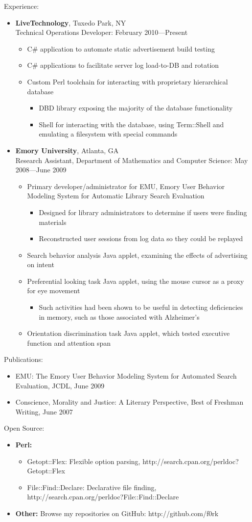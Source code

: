 \documentclass[10pt,oneside]{article}
\newenvironment{ressection}[1]{
	\vspace{1pt}
	{\fontfamily{phv}\selectfont\Large#1}
	\begin{itemize}
	\vspace{1pt}
}{
	\end{itemize}
}
\newcommand{\resitem}[1]{
	\vspace{-4pt}
	\item \begin{flushleft} #1 \end{flushleft}
}
\newcommand{\ressubitem}[1]{
	\vspace{-2pt}
	\item \begin{flushleft} #1 \end{flushleft}
}
\newcommand{\ressubsubitem}[1]{
	\vspace{-2pt}
    \begin{itemize} \item #1 \end{itemize}
}
\newcommand{\resbigitem}[3]{
	\vspace{-5pt}
	\item
	\textbf{#1}, #2 \\
	#3
}
\newenvironment{ressubsec}[3]{
	\resbigitem{#1}{#2}{#3}
	\vspace{-2pt}
	\begin{itemize}
}{
	\end{itemize}
}
\newenvironment{reslist}[1]{
	\resitem{\textbf{#1}}
	\vspace{-5pt}
	\begin{itemize}
}{
	\end{itemize}
}
\begin{document}
\begin{ressection}{Experience:}

	\begin{ressubsec}{LiveTechnology}{Tuxedo Park, NY}{Technical Operations Developer: February 2010---Present}
        \ressubitem{C\# application to automate static advertisement build testing}
        \ressubitem{C\# applications to facilitate server log load-to-DB and rotation}
		\ressubitem{Custom Perl toolchain for interacting with proprietary hierarchical database}
        \ressubsubitem{DBD library exposing the majority of the database functionality}
        \ressubsubitem{Shell for interacting with the database, using Term::Shell and emulating a filesystem with special commands}
    \end{ressubsec}

	\begin{ressubsec}{Emory University}{Atlanta, GA}{Research Assistant, Department of Mathematics and Computer Science: May 2008---June 2009}
		\ressubitem{Primary developer/administrator for EMU, Emory User Behavior Modeling System for Automatic Library Search Evaluation}
        \ressubsubitem{Designed for library administrators to determine if users were finding materials}
		\ressubsubitem{Reconstructed user sessions from log data so they could be replayed}
		\ressubitem{Search behavior analysis Java applet, examining the effects of advertising on intent} 
		\ressubitem{Preferential looking task Java applet, using the mouse cursor as a proxy for eye movement}
        \ressubsubitem{Such activities had been shown to be useful in detecting deficiencies in memory, such as those associated with Alzheimer's}
        \ressubitem{Orientation discrimination task Java applet, which tested executive function and attention span}
	\end{ressubsec}

\end{ressection}

\begin{ressection}{Publications:}

    \resitem{EMU: The Emory User Behavior Modeling System for Automated Search Evaluation, JCDL, June 2009}
    \resitem{Conscience, Morality and Justice: A Literary Perspective, Best of Freshman Writing, June 2007}
	
\end{ressection}

\begin{ressection}{Open Source:}

	\begin{reslist}{Perl:}
		\ressubitem{Getopt::Flex: Flexible option parsing, http://search.cpan.org/perldoc?Getopt::Flex}
		\ressubitem{File::Find::Declare: Declarative file finding, http://search.cpan.org/perldoc?File::Find::Declare}
	\end{reslist}

    \resitem{\textbf{Other:} Browse my repositories on GitHub: http://github.com/f0rk}

\end{ressection}
\end{document}
